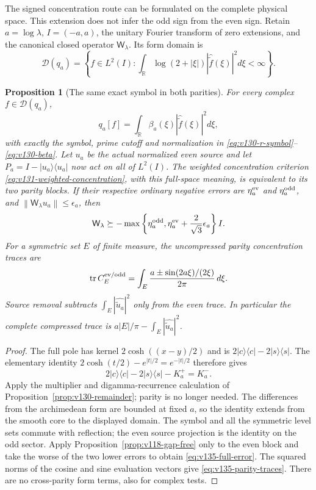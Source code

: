 \documentclass[11pt]{article}
\newtheorem{proposition}[theorem]{Proposition}
\theoremstyle{remark}
\newcommand{\norm}[1]{\left\lVert #1\right\rVert}
\begin{document}
The signed concentration route can be formulated on the complete physical
space.  This extension does not infer the odd sign from the even sign.
Retain $a=\log\lambda$, $I=(-a,a)$, the unitary Fourier transform of
zero extensions, and the canonical closed operator $\mathsf W_\lambda$.
Its form domain is
\[
 \mathcal D(q_a)=\left\{f\in L^2(I):
 \int_{\mathbb R}\log(2+|\xi|)
       |\widehat{\widetilde f}(\xi)|^2d\xi<\infty\right\}.
\]

\begin{proposition}[The same exact symbol in both parities]
\label{prop:v135-both-parities}
For every complex $f\in\mathcal D(q_a)$,
\begin{equation}\label{eq:v135-full-symbol}
 q_a[f]=\int_{\mathbb R}\beta_a(\xi)
                    |\widehat{\widetilde f}(\xi)|^2d\xi,
\end{equation}
with exactly the symbol, prime cutoff and normalization in
\eqref{eq:v130-r-symbol}--\eqref{eq:v130-beta}.
Let $u_a$ be the actual normalized even source and let
$P_a=I-|u_a\rangle\langle u_a|$ now act on all of $L^2(I)$.
The weighted concentration criterion
\eqref{eq:v131-weighted-concentration}, with this full-space meaning,
is equivalent to its two parity blocks.  If their respective ordinary
negative errors are $\eta_a^{\rm ev}$ and $\eta_a^{\rm odd}$, and
$\norm{\mathsf W_\lambda u_a}\le\epsilon_a$, then
\begin{equation}\label{eq:v135-full-error}
 \mathsf W_\lambda\succeq-
 \max\left\{\eta_a^{\rm odd},
      \eta_a^{\rm ev}+\frac2{\sqrt3}\epsilon_a\right\}I.
\end{equation}
For a symmetric set $E$ of finite measure, the uncompressed parity
concentration traces are
\begin{equation}\label{eq:v135-parity-traces}
 \operatorname{tr}C_E^{\rm ev/odd}
 =\int_E\frac{a\mathbin{\pm}\sin(2a\xi)/(2\xi)}{2\pi}\,d\xi.
\end{equation}
Source removal subtracts $\int_E|\widehat{\widetilde u_a}|^2$ only
from the even trace.  In particular the complete compressed trace is
$a|E|/\pi-\int_E|\widehat{\widetilde u_a}|^2$.
\end{proposition}
\begin{proof}
The full pole has kernel $2\cosh((x-y)/2)$ and is
$2|c\rangle\langle c|-2|s\rangle\langle s|$.  The elementary
identity $2\cosh(t/2)-e^{|t|/2}=e^{-|t|/2}$ therefore gives
\[
 2|c\rangle\langle c|-2|s\rangle\langle s|-K_a^+=K_a^-.
\]
Apply the multiplier and digamma-recurrence calculation of
Proposition~\ref{prop:v130-remainder}; parity is no longer needed.
The differences from the archimedean form are bounded at fixed $a$,
so the identity extends from the smooth core to the displayed domain.
The symbol and all the symmetric level sets commute with reflection;
the even source projection is the identity on the odd sector.
Apply Proposition~\ref{prop:v118-gap-free} only to the even block and
take the worse of the two lower errors to obtain
\eqref{eq:v135-full-error}.  The squared norms of the cosine and sine
evaluation vectors give \eqref{eq:v135-parity-traces}.  There are no
cross-parity form terms, also for complex tests.
\end{proof}
\end{document}
